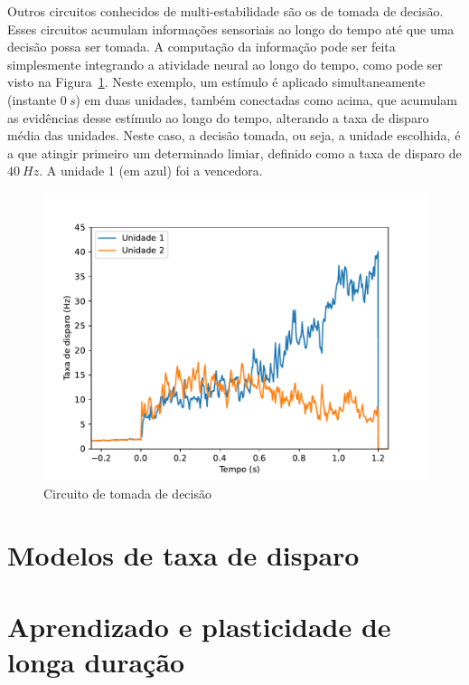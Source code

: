 Outros circuitos conhecidos de multi-estabilidade são os de tomada de decisão. Esses circuitos acumulam informações sensoriais ao longo do tempo até que uma decisão possa ser tomada. A computação da informação pode ser feita simplesmente integrando a atividade neural ao longo do tempo,
como pode ser visto na Figura~\ref{fig:tomadadecisao}. Neste exemplo, um estímulo é aplicado simultaneamente (instante $0\ s$) em duas unidades, também conectadas como acima, que acumulam as evidências desse estímulo ao longo do tempo, alterando a taxa de disparo média das unidades. Neste caso, a decisão tomada, ou seja, a unidade escolhida, é a que atingir primeiro um determinado limiar, definido como a taxa de disparo de $40\ Hz$. A unidade 1 (em azul) foi a vencedora.
\begin{figure}[tb]
	\centering
	\caption[Circuito de tomada de decisão]{Circuito de tomada de decisão}
	\label{fig:tomadadecisao}
	\includegraphics[width=0.7\linewidth]{figs/tomada_decisao}
\end{figure}

\section{Modelos de taxa de disparo}\label{sec:modelostaxa}

\section{Aprendizado e plasticidade de longa duração}\label{sec:aprendizado}

